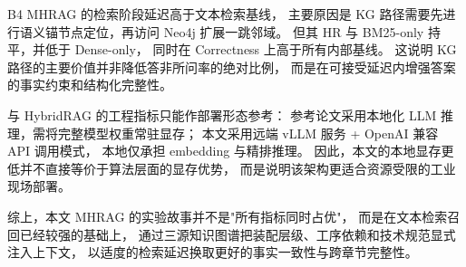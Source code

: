 B4 MHRAG 的检索阶段延迟高于文本检索基线，
主要原因是 KG 路径需要先进行语义锚节点定位，再访问 Neo4j 扩展一跳邻域。
但其 HR 与 BM25-only 持平，并低于 Dense-only，
同时在 Correctness 上高于所有内部基线。
这说明 KG 路径的主要价值并非降低答非所问率的绝对比例，
而是在可接受延迟内增强答案的事实约束和结构化完整性。

与 HybridRAG\cite{shen2025hybridrag} 的工程指标只能作部署形态参考：
参考论文采用本地化 LLM 推理，需将完整模型权重常驻显存；
本文采用远端 vLLM 服务 + OpenAI 兼容 API 调用模式，
本地仅承担 embedding 与精排推理。
因此，本文的本地显存更低并不直接等价于算法层面的显存优势，
而是说明该架构更适合资源受限的工业现场部署。

综上，本文 MHRAG 的实验故事并不是"所有指标同时占优"，
而是在文本检索召回已经较强的基础上，
通过三源知识图谱把装配层级、工序依赖和技术规范显式注入上下文，
以适度的检索延迟换取更好的事实一致性与跨章节完整性。
